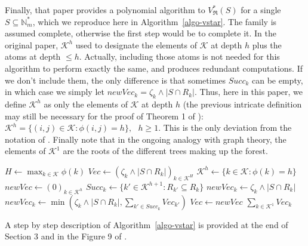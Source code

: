 \documentclass[
  11pt,
  a4paper,
]{article}
\theoremstyle{plain}
\theoremstyle{definition}
\theoremstyle{plain}
\theoremstyle{definition}
\theoremstyle{plain}
\theoremstyle{remark}
\begin{document}
Finally, that paper provides a polynomial algorithm to
\(V^*_{\mathfrak{R}}(S)\) for a single \(S\subseteq\mathbb{N}_m^*\),
which we reproduce here in Algorithm~\ref{algo-vstar}. The family is
assumed complete, otherwise the first step would be to complete it. In
the original paper, \(\mathcal{K}^h\) used to designate the elements of
\(\mathcal{K}\) at depth \(h\) plus the atoms at depth \(\leq h\).
Actually, including those atoms is not needed for this algorithm to
perform exactly the same, and produces redundant computations. If we
don't include them, the only difference is that sometimes \(Succ_k\) can
be empty, in which case we simply let
\(newVec_k=\zeta_k\wedge|S\cap R_k|\). Thus, here in this paper, we
define \(\mathcal{K}^h\) as only the elements of \(\mathcal{K}\) at
depth \(h\) (the previous intricate definition may still be necessary
for the proof of Theorem 1 of \citet{MR4178188}):
\(\mathcal{K}^h=\{ (i,j)\in\mathcal{K}: \phi(i,j)=h      \}, \:\:\:h\geq 1.\)
This is the only deviation from the notation of \citet{MR4178188}.
Finally note that in the ongoing analogy with graph theory, the elements
of \(\mathcal{K}^1\) are the roots of the different trees making up the
forest.

\begin{algorithm}[htb!]
\caption{\label{algo-vstar}Computation of a given $V^*_{\mathfrak{R}}(S)$ with a complete family}
\begin{algorithmic}[1]
  \State $ H \gets \max_{k\in\mathcal{K}} \phi(k)  $ 
  \State $Vec\gets (\zeta_{k}\wedge|S\cap R_k|)_{k \in  \mathcal{K}^H}$ 
    \State $\mathcal{K}^h\gets \{ k\in\mathcal{K} : \phi(k) =h  \}$
    \State $newVec\gets (0)_{k \in  \mathcal{K}^h}$
      \State $Succ_k \gets \{ k' \in  \mathcal{K}^{h+1} : R_{k'}\subseteq R_k\}$
        \State $newVec_k \gets \zeta_k\wedge|S\cap R_k|$
      \Else
        \State $newVec_k \gets \min\left( \zeta_{k}\wedge|S\cap R_k| ,  \sum_{k'\in Succ_k} Vec_{k'}   \right)$
      \EndIf
    \EndFor
    \State $Vec\gets newVec$
  \EndFor
  \State\Return $\sum_{k\in\mathcal{K}^1} Vec_k  $
\EndProcedure
\end{algorithmic}
\end{algorithm}

A step by step description of Algorithm~\ref{algo-vstar} is provided at
the end of Section 3 and in the Figure 9 of \citet{MR4178188}.
\end{document}
